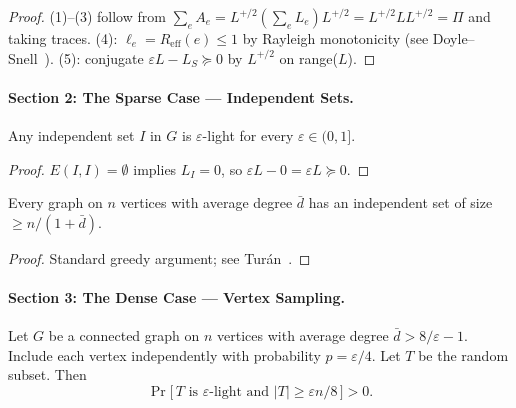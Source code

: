 \begin{proof}
(1)--(3) follow from $\sum_e A_e = L^{+/2}(\sum_e L_e)L^{+/2}
= L^{+/2} L L^{+/2} = \Pi$ and taking traces.
(4): $\ell_e = R_{\mathrm{eff}}(e) \leq 1$ by Rayleigh monotonicity
(see Doyle--Snell~\cite{DS84}).
(5): conjugate $\varepsilon L - L_S \succeq 0$ by $L^{+/2}$ on range($L$).
\end{proof}


\paragraph{Section 2: The Sparse Case --- Independent Sets.}

\begin{lemma}\label{lem:p6-IS-light}
Any independent set $I$ in $G$ is $\varepsilon$-light for every
$\varepsilon \in (0,1]$.
\end{lemma}

\begin{proof}
$E(I, I) = \emptyset$ implies $L_I = 0$, so
$\varepsilon L - 0 = \varepsilon L \succeq 0$.
\end{proof}

\begin{lemma}\label{lem:p6-turan}
Every graph on $n$ vertices with average degree $\bar{d}$ has an
independent set of size $\geq n/(1 + \bar{d})$.
\end{lemma}

\begin{proof}
Standard greedy argument; see Tur\'an~\cite{Tur41}.
\end{proof}


\paragraph{Section 3: The Dense Case --- Vertex Sampling.}

\begin{lemma}\label{lem:p6-dense}
Let $G$ be a connected graph on $n$ vertices with average degree
$\bar{d} > 8/\varepsilon - 1$.  Include each vertex independently with
probability $p = \varepsilon/4$.  Let $T$ be the random subset.  Then
\[
  \Pr\!\big[\,T \text{ is $\varepsilon$-light and } |T| \geq \varepsilon n / 8\,\big] > 0.
\]
\end{lemma}

